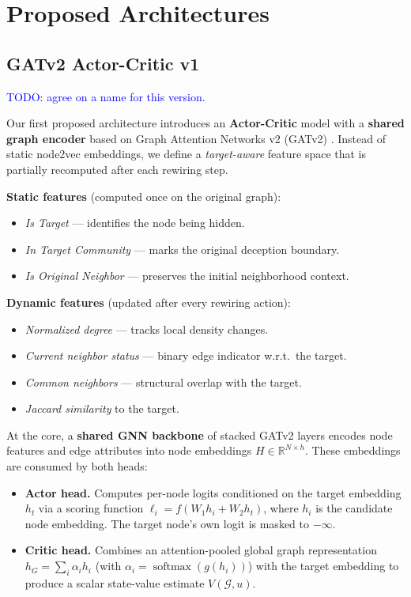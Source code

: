 \documentclass[twocolumn,a4paper]{article}
\begin{document}
\section{Proposed Architectures}

\subsection{GATv2 Actor-Critic v1}
\textcolor{blue}{TODO: agree on a name for this version.}

Our first proposed architecture introduces an \textbf{Actor-Critic} model with
a \textbf{shared graph encoder} based on Graph Attention Networks v2 (GATv2)
\parencite{brody2022attentivegraphattentionnetworks}. Instead of static
node2vec embeddings, we define a \textit{target-aware} feature space that is
partially recomputed after each rewiring step.

\textbf{Static features} (computed once on the original graph):
\begin{itemize}
  \item \textit{Is Target} — identifies the node being hidden.
  \item \textit{In Target Community} — marks the original deception boundary.
  \item \textit{Is Original Neighbor} — preserves the initial neighborhood context.
\end{itemize}

\textbf{Dynamic features} (updated after every rewiring action):
\begin{itemize}
  \item \textit{Normalized degree} — tracks local density changes.
  \item \textit{Current neighbor status} — binary edge indicator w.r.t.\ the target.
  \item \textit{Common neighbors} — structural overlap with the target.
  \item \textit{Jaccard similarity} to the target.
\end{itemize}

At the core, a \textbf{shared GNN backbone} of stacked GATv2 layers encodes
node features and edge attributes into node embeddings $H \in \mathbb{R}^{N
\times h}$. These embeddings are consumed by both heads:

\begin{itemize}
  \item \textbf{Actor head.} Computes per-node logits conditioned on the
    target embedding $h_t$ via a scoring function
    $\ell_i = f(W_1 h_i + W_2 h_t)$, where $h_i$ is the candidate node
    embedding. The target node's own logit is masked to $-\infty$.

  \item \textbf{Critic head.} Combines an attention-pooled global graph
    representation $h_G = \sum_i \alpha_i h_i$ (with
    $\alpha_i = \operatorname{softmax}(g(h_i))$) with the target embedding
    to produce a scalar state-value estimate $V(\mathcal{G}, u)$.
\end{itemize}
\end{document}
